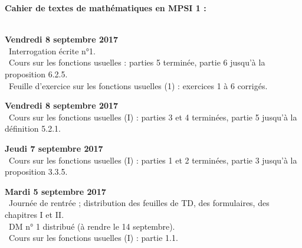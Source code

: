 \documentclass[12pt,a4paper]{article}
\begin{document}
\begin{center}
\Large\bf Cahier de textes de mathématiques en MPSI 1 :
\end{center}
\vspace{1cm}
\vspace{.4cm}\\

\noindent\textbf{Vendredi 8 septembre 2017}\\
\bu\ Interrogation écrite n°1. \\
\bu\ Cours sur les fonctions usuelles : parties 5 terminée, partie 6 jusqu'à la proposition 6.2.5. \\
\bu\ Feuille d'exercice sur les fonctions usuelles (1) : exercices 1 à 6 corrigés. \\
\vspace{.4cm}

\noindent\textbf{Vendredi 8 septembre 2017}\\
\bu\ Cours sur les fonctions usuelles (I) : parties 3 et 4 terminées, partie 5 jusqu'à la définition 5.2.1. \\
\vspace{.4cm}

\noindent\textbf{Jeudi 7 septembre 2017}\\
\bu\ Cours sur les fonctions usuelles (I) : parties 1 et 2 terminées, partie 3 jusqu'à la proposition 3.3.5. \\
\vspace{.4cm}

\noindent\textbf{Mardi 5 septembre 2017}\\
\bu\ Journée de rentrée ; distribution des feuilles de TD, des formulaires, des
chapitres I et II.  \\
\bu\ DM n° 1 distribué (à rendre le 14 septembre). \\
\bu\ Cours sur les fonctions usuelles (I) : partie 1.1. \\
\vspace{.4cm}


\label{end}
\end{document}
